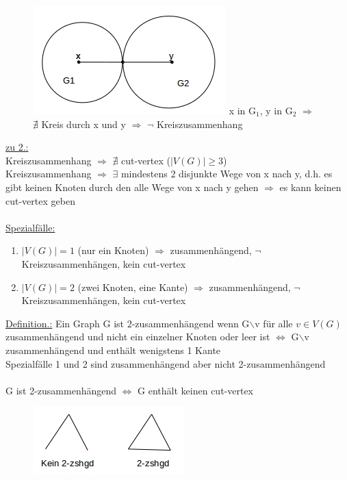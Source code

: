 \begin{figure}[htp]
\centering
\includegraphics[scale=0.9]{lectures/161021/pix/pic5.jpg}
x in G$_1$, y in G$_2$ $\Rightarrow$ $\nexists$ Kreis durch x und y $\Rightarrow$ $\neg$ Kreiszusammenhang
\end{figure}

\newpage
\underline{zu 2.:}\\
Kreiszusammenhang $\Rightarrow$ $\nexists$ cut-vertex ($|V(G)| \geq 3$)\\
Kreiszusammenhang $\Rightarrow$ $\exists$ mindestens 2 disjunkte Wege von x nach y, d.h. es gibt keinen Knoten durch den alle Wege von x nach y gehen $\Rightarrow$ es kann keinen cut-vertex geben
\\\\
\underline{Spezialfälle:}\\
\begin{enumerate}
	\item $|V(G)| = 1$ (nur ein Knoten) $\Rightarrow$ zusammenhängend, $\neg$ Kreiszusammenhängen, kein cut-vertex
	\item $|V(G)| = 2$ (zwei Knoten, eine Kante) $\Rightarrow$ zusammenhängend, $\neg$ Kreiszusammenhängen, kein cut-vertex
\end{enumerate}

\underline{Definition.:} Ein Graph G ist 2-zusammenhängend wenn G$\backslash$v für alle $v \in V(G)$ zusammenhängend und nicht ein einzelner Knoten oder leer ist $\Leftrightarrow$ G$\backslash$v zusammenhängend und enthält wenigstens 1 Kante\\

Spezialfälle 1 und 2 sind zusammenhängend aber nicht 2-zusammenhängend
\\\\
G ist 2-zusammenhängend $\Leftrightarrow$ G enthält keinen cut-vertex
\begin{figure}[htp]
\centering
\includegraphics[scale=0.9]{lectures/161021/pix/pic6.jpg}
\end{figure}

